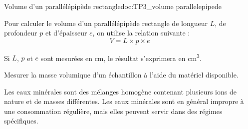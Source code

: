 \begin{doc}{Volume d'un parallélépipède rectangle}{doc:TP3_volume parallelepipede}
  \begin{multicols}{2}
    Pour calculer le volume d'un parallélépipède rectangle de longueur $L$, de profondeur $p$ et d’épaisseur $e$, on utilise la relation suivante :
    \begin{equation*}
      V = L \times p \times e
    \end{equation*}

    \centering
  \end{multicols}
  Si $L$, $p$ et $e$ sont mesurées en \unit{\cm},
  le résultat s’exprimera en \unit{\cubic\cm}.
\end{doc}

\mesure Mesurer la masse volumique d'un échantillon à l'aide du matériel disponible.




\begin{importants}
  Les eaux minérales sont des mélanges homogène contenant plusieurs ions de nature et de masses différentes.
  Les eaux minérales sont en général impropre à une consommation régulière, mais elles peuvent servir dans des régimes spécifiques.
  
  \hspace{8pt} 
\end{importants}



